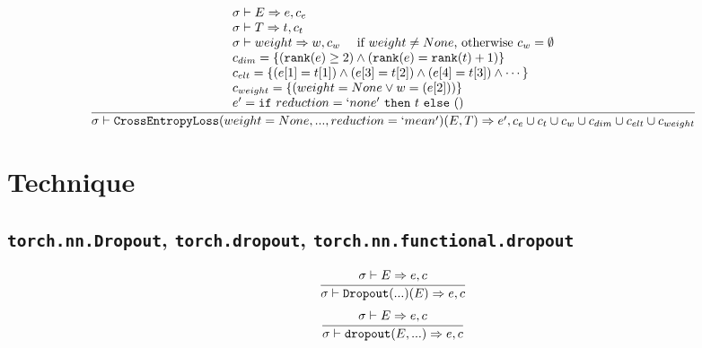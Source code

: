\documentclass{article}
\begin{document}
\begin{align*}
  \frac
  {
    \begin{array}{l}
      \sigma \vdash E \Rightarrow e, c_e \\
      \sigma \vdash T \Rightarrow t, c_t \\
      \sigma \vdash weight \Rightarrow w, c_w \,\,\,\,\,\,\,\, \text{if $weight \neq None$, otherwise $c_w = \emptyset$} \\
      c_{dim} = \{ (\mathtt{rank(}e\mathtt{)} \geq 2) \land (\mathtt{rank(}e\mathtt{)} = \mathtt{rank(}t\mathtt{)} + 1)\} \\
      c_{elt} = \{ (e[1] = t[1]) \land (e[3] = t[2]) \land (e[4] = t[3]) \land \cdots \} \\
      c_{weight} = \{ (weight = None \lor w = (e[2])) \} \\
      e' = \mathtt{if}\,\,reduction = `none'\,\,\mathtt{then}\,\,t\,\,\mathtt{else}\,\,()
    \end{array}
  }
  {
    \sigma \vdash \mathtt{CrossEntropyLoss(}weight=None, ..., reduction=`mean'\mathtt{)(}E, T\mathtt{)}
      \Rightarrow e', c_e \cup c_t \cup c_w \cup c_{dim} \cup c_{elt} \cup c_{weight}
  }
\end{align*}


\section*{Technique}
\subsection*{\texttt{torch.nn.Dropout}, \texttt{torch.dropout}, \texttt{torch.nn.functional.dropout}}
\begin{align*}
  \frac
  {
    \begin{array}{l}
      \sigma \vdash E \Rightarrow e, c
    \end{array}
  }
  {
    \sigma \vdash \mathtt{Dropout(}...\mathtt{)(}E\mathtt{)} \Rightarrow e, c
  }
\end{align*}
\begin{align*}
  \frac
  {
    \begin{array}{l}
      \sigma \vdash E \Rightarrow e, c
    \end{array}
  }
  {
    \sigma \vdash \mathtt{dropout(}E, ...\mathtt{)} \Rightarrow e, c
  }
\end{align*}
\end{document}
